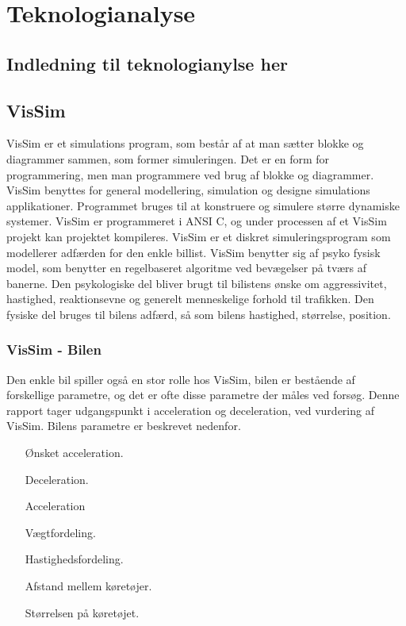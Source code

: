 \chapter{Teknologianalyse}\label{Teknologianalyse}

\section{Indledning til teknologianylse her}

\section{VisSim}
VisSim er et simulations program, som består af at man sætter blokke og diagrammer sammen, som former simuleringen. Det er en form for programmering, men man programmere ved brug af blokke og diagrammer. VisSim benyttes for general modellering, simulation og designe simulations applikationer. Programmet bruges til at konstruere og simulere større dynamiske systemer. VisSim er programmeret i ANSI C, og under processen af et VisSim projekt kan projektet kompileres.  
VisSim er et diskret simuleringsprogram som modellerer adfærden for den enkle billist. VisSim benytter sig af psyko fysisk model, som benytter en regelbaseret algoritme ved bevægelser på tværs af banerne. Den psykologiske del bliver brugt til bilistens ønske om aggressivitet, hastighed, reaktionsevne og generelt menneskelige forhold til trafikken. Den fysiske del bruges til bilens adfærd, så som bilens hastighed, størrelse, position. 

\subsection{VisSim - Bilen}
Den enkle bil spiller også en stor rolle hos VisSim, bilen er bestående af forskellige parametre, og det er ofte disse parametre der måles ved forsøg. Denne rapport tager udgangspunkt i acceleration og deceleration, ved vurdering af VisSim. Bilens parametre er beskrevet nedenfor.

\begin{itemize}
\item[Ønsket acceleration.]
\item[Deceleration.]
\item[Acceleration]
\item[Vægtfordeling.]
\item[Hastighedsfordeling.]
\item[Afstand mellem køretøjer.]
\item[Størrelsen på køretøjet.]
\end{itemize}

